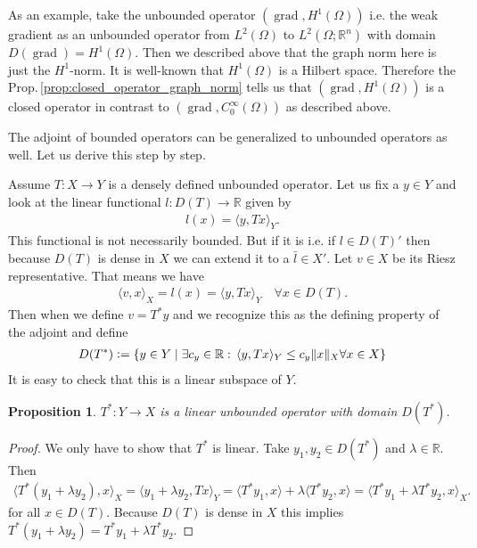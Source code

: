 \documentclass[12pt,a4paper]{article}
\numberwithin{equation}{subsection}
\numberwithin{lemma}{subsection}
\newtheorem{proposition}[lemma]{Proposition}
\theoremstyle{definition}
\DeclareMathOperator{\grad}{grad}
\newcommand{\real}{\mathbb{R}}
\begin{document}
As an example, take the unbounded operator $(\grad, H^1(\Omega))$
i.e. the weak gradient as an unbounded operator 
from $L^2(\Omega)$ to $L^2(\Omega;\real^n)$ with 
domain $D(\grad) = H^1(\Omega)$. Then we described above that the 
graph norm here is just the $H^1$-norm. It is well-known that 
$H^1(\Omega)$ is a Hilbert space. Therefore the 
Prop.\,\ref{prop:closed_operator_graph_norm} tells us that 
$(\grad, H^1(\Omega))$ is a closed operator in contrast to 
$(\grad, C_0^\infty(\Omega))$ as described above.

The adjoint of bounded operators can be generalized to unbounded operators 
as well. Let us derive this step by step. 

Assume $T: X \rightarrow Y$ is a densely defined unbounded operator. 
Let us fix a $y \in Y$ and 
look at the linear functional $l:D(T) \rightarrow \real$ given by
\begin{align*}
    l(x) = \langle y, Tx \rangle_Y.
\end{align*}
This functional is not necessarily bounded. But if it is i.e. if $l \in D(T)'$ 
then because $D(T)$ is dense in $X$ we can extend it to a
$\bar{l} \in X'$. Let $v \in X$ be its Riesz representative. That means we have
\begin{align*}
    \langle v, x \rangle_X = l(x) = \langle y, Tx \rangle_Y 
        \quad \forall x \in D(T).
\end{align*}
Then when we define $v = T^* y$ and we 
recognize this as the defining property of the adjoint and define 
\begin{align*}
    D(T^*) \vcentcolon= \{ y \in Y \mid \exists c_y \in \real:
        \,\langle y, Tx \rangle_Y \leq c_y \lVert x \rVert _X \forall x \in X\}
\end{align*}
It is easy to check that this is a linear subspace of $Y$.

\begin{proposition}
    $T^*: Y \rightarrow X $ is a linear unbounded operator with domain $D(T^*)$.
\end{proposition}
\begin{proof}
    We only have to show that $T^*$ is linear. Take $y_1, y_2 \in D(T^*)$ 
    and $\lambda \in \real$. Then
    \begin{align*}
        \langle T^*(y_1 + \lambda y_2), x \rangle _X
        = \langle y_1 + \lambda y_2, Tx \rangle _Y
        = \langle T^*y_1, x \rangle + \lambda \langle T^*y_2, x \rangle
        = \langle T^*y_1 + \lambda T^*y_2, x\rangle_X.
    \end{align*}
    for all $x \in D(T)$. Because $D(T)$ is dense in $X$ this implies 
    $T^*(y_1 + \lambda y_2) = T^*y_1 + \lambda T^*y_2$.
\end{proof}
\end{document}
